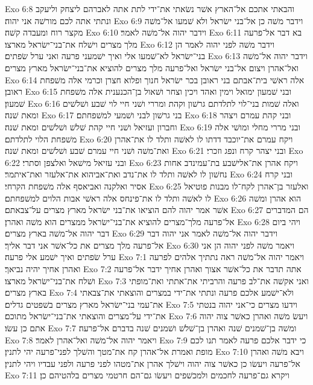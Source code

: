 Exo 6:8  והבאתי אתכם אל־הארץ אשׁר נשׂאתי את־ידי לתת אתה לאברהם ליצחק וליעקב ונתתי אתה לכם מורשׁה אני יהוה׃
Exo 6:9  וידבר משׁה כן אל־בני ישׂראל ולא שׁמעו אל־משׁה מקצר רוח ומעבדה קשׁה׃
Exo 6:10  וידבר יהוה אל־משׁה לאמר׃
Exo 6:11  בא דבר אל־פרעה מלך מצרים וישׁלח את־בני־ישׂראל מארצו׃
Exo 6:12  וידבר משׁה לפני יהוה לאמר הן בני־ישׂראל לא־שׁמעו אלי ואיך ישׁמעני פרעה ואני ערל שׂפתים׃
Exo 6:13  וידבר יהוה אל־משׁה ואל־אהרן ויצום אל־בני ישׂראל ואל־פרעה מלך מצרים להוציא את־בני־ישׂראל מארץ מצרים׃
Exo 6:14  אלה ראשׁי בית־אבתם בני ראובן בכר ישׂראל חנוך ופלוא חצרן וכרמי אלה משׁפחת ראובן׃
Exo 6:15  ובני שׁמעון ימואל וימין ואהד ויכין וצחר ושׁאול בן־הכנענית אלה משׁפחת שׁמעון׃
Exo 6:16  ואלה שׁמות בני־לוי לתלדתם גרשׁון וקהת ומררי ושׁני חיי לוי שׁבע ושׁלשׁים ומאת שׁנה׃
Exo 6:17  בני גרשׁון לבני ושׁמעי למשׁפחתם׃
Exo 6:18  ובני קהת עמרם ויצהר וחברון ועזיאל ושׁני חיי קהת שׁלשׁ ושׁלשׁים ומאת שׁנה׃
Exo 6:19  ובני מררי מחלי ומושׁי אלה משׁפחת הלוי לתלדתם׃
Exo 6:20  ויקח עמרם את־יוכבד דדתו לו לאשׁה ותלד לו את־אהרן ואת־משׁה ושׁני חיי עמרם שׁבע ושׁלשׁים ומאת שׁנה׃
Exo 6:21  ובני יצהר קרח ונפג וזכרי׃
Exo 6:22  ובני עזיאל מישׁאל ואלצפן וסתרי׃
Exo 6:23  ויקח אהרן את־אלישׁבע בת־עמינדב אחות נחשׁון לו לאשׁה ותלד לו את־נדב ואת־אביהוא את־אלעזר ואת־איתמר׃
Exo 6:24  ובני קרח אסיר ואלקנה ואביאסף אלה משׁפחת הקרחי׃
Exo 6:25  ואלעזר בן־אהרן לקח־לו מבנות פוטיאל לו לאשׁה ותלד לו את־פינחס אלה ראשׁי אבות הלוים למשׁפחתם׃
Exo 6:26  הוא אהרן ומשׁה אשׁר אמר יהוה להם הוציאו את־בני ישׂראל מארץ מצרים על־צבאתם׃
Exo 6:27  הם המדברים אל־פרעה מלך־מצרים להוציא את־בני־ישׂראל ממצרים הוא משׁה ואהרן׃
Exo 6:28  ויהי ביום דבר יהוה אל־משׁה בארץ מצרים׃
Exo 6:29  וידבר יהוה אל־משׁה לאמר אני יהוה דבר אל־פרעה מלך מצרים את כל־אשׁר אני דבר אליך׃
Exo 6:30  ויאמר משׁה לפני יהוה הן אני ערל שׂפתים ואיך ישׁמע אלי פרעה׃
Exo 7:1  ויאמר יהוה אל־משׁה ראה נתתיך אלהים לפרעה ואהרן אחיך יהיה נביאך׃
Exo 7:2  אתה תדבר את כל־אשׁר אצוך ואהרן אחיך ידבר אל־פרעה ושׁלח את־בני־ישׂראל מארצו׃
Exo 7:3  ואני אקשׁה את־לב פרעה והרביתי את־אתתי ואת־מופתי בארץ מצרים׃
Exo 7:4  ולא־ישׁמע אלכם פרעה ונתתי את־ידי במצרים והוצאתי את־צבאתי את־עמי בני־ישׂראל מארץ מצרים בשׁפטים גדלים׃
Exo 7:5  וידעו מצרים כי־אני יהוה בנטתי את־ידי על־מצרים והוצאתי את־בני־ישׂראל מתוכם׃
Exo 7:6  ויעשׂ משׁה ואהרן כאשׁר צוה יהוה אתם כן עשׂו׃
Exo 7:7  ומשׁה בן־שׁמנים שׁנה ואהרן בן־שׁלשׁ ושׁמנים שׁנה בדברם אל־פרעה׃
Exo 7:8  ויאמר יהוה אל־משׁה ואל־אהרן לאמר׃
Exo 7:9  כי ידבר אלכם פרעה לאמר תנו לכם מופת ואמרת אל־אהרן קח את־מטך והשׁלך לפני־פרעה יהי לתנין׃
Exo 7:10  ויבא משׁה ואהרן אל־פרעה ויעשׂו כן כאשׁר צוה יהוה וישׁלך אהרן את־מטהו לפני פרעה ולפני עבדיו ויהי לתנין׃
Exo 7:11  ויקרא גם־פרעה לחכמים ולמכשׁפים ויעשׂו גם־הם חרטמי מצרים בלהטיהם כן׃
